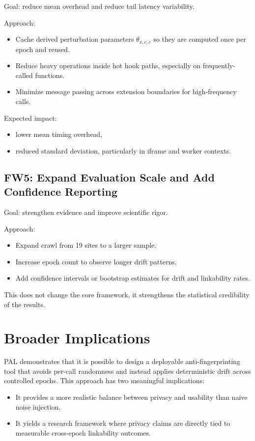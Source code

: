 \documentclass[11pt]{report}
\begin{document}
Goal: reduce mean overhead and reduce tail latency variability.

Approach:
\begin{itemize}
    \item Cache derived perturbation parameters $\theta_{x,c,e}$ so they are computed once per epoch and reused.
    \item Reduce heavy operations inside hot hook paths, especially on frequently-called functions.
    \item Minimize message passing across extension boundaries for high-frequency calls.
\end{itemize}

Expected impact:
\begin{itemize}
    \item lower mean timing overhead,
    \item reduced standard deviation, particularly in iframe and worker contexts.
\end{itemize}

\subsection{FW5: Expand Evaluation Scale and Add Confidence Reporting}

Goal: strengthen evidence and improve scientific rigor.

Approach:
\begin{itemize}
    \item Expand crawl from 19 sites to a larger sample.
    \item Increase epoch count to observe longer drift patterns.
    \item Add confidence intervals or bootstrap estimates for drift and linkability rates.
\end{itemize}

This does not change the core framework, it strengthens the statistical credibility of the results.

\section{Broader Implications}

PAL demonstrates that it is possible to design a deployable anti-fingerprinting tool that avoids per-call randomness and instead applies deterministic drift across controlled epochs. This approach has two meaningful implications:

\begin{itemize}
    \item It provides a more realistic balance between privacy and usability than naive noise injection.
    \item It yields a research framework where privacy claims are directly tied to measurable cross-epoch linkability outcomes.
\end{itemize}
\end{document}
